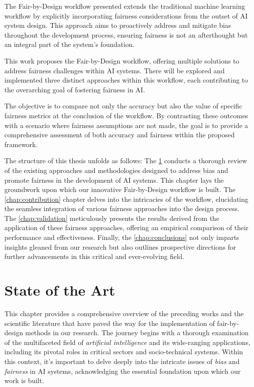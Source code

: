\documentclass[12pt,a4paper,openright,twoside]{book}
\begin{document}
The Fair-by-Design workflow presented extends the traditional machine learning workflow by explicitly incorporating fairness considerations from the outset of AI system design. This approach aims to proactively address and mitigate bias throughout the development process, ensuring fairness is not an afterthought but an integral part of the system's foundation.

This work proposes the Fair-by-Design workflow, offering multiple solutions to address fairness challenges within AI systems. There will be explored and implemented three distinct approaches within this workflow, each contributing to the overarching goal of fostering fairness in AI.

The objective is to compare not only the accuracy but also the value of specific fairness metrics at the conclusion of the workflow. By contrasting these outcomes with a scenario where fairness assumptions are not made, the goal is to provide a comprehensive assessment of both accuracy and fairness within the proposed framework.

The structure of this thesis unfolds as follows: The \cref{chap:background} conducts a thorough review of the existing approaches and methodologies designed to address bias and promote fairness in the development of AI systems. This chapter lays the groundwork upon which our innovative Fair-by-Design workflow is built. The \cref{chap:contribution} chapter delves into the intricacies of the workflow, elucidating the seamless integration of various fairness approaches into the design process. The \cref{chap:validation} meticulously presents the results derived from the application of these fairness approaches, offering an empirical comparison of their performance and effectiveness. Finally, the \cref{chap:conclusions} not only imparts insights gleaned from our research but also outlines prospective directions for further advancements in this critical and ever-evolving field.

\chapter{State of the Art} %
\label{chap:background}

This chapter provides a comprehensive overview of the preceding works and the scientific literature that have paved the way for the implementation of fair-by-design methods in our research. The journey begins with a thorough examination of the multifaceted field of \emph{artificial intelligence} and its wide-ranging applications, including its pivotal roles in critical sectors and socio-technical systems. Within this context, it's important to delve deeply into the intricate issues of \emph{bias} and \emph{fairness} in AI systems, acknowledging the essential foundation upon which our work is built. 
\end{document}
